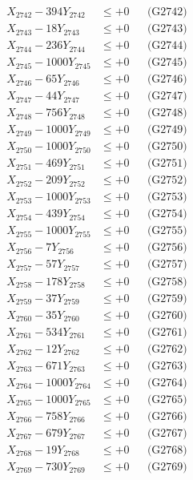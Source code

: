 \documentclass[a4paper,10pt]{article}
\begin{document}
{\begin{align}
X_{2742} - 394Y_{2742} &\leq +0 && \text{(G2742)} \\
X_{2743} - 18Y_{2743} &\leq +0 && \text{(G2743)} \\
X_{2744} - 236Y_{2744} &\leq +0 && \text{(G2744)} \\
X_{2745} - 1000Y_{2745} &\leq +0 && \text{(G2745)} \\
X_{2746} - 65Y_{2746} &\leq +0 && \text{(G2746)} \\
X_{2747} - 44Y_{2747} &\leq +0 && \text{(G2747)} \\
X_{2748} - 756Y_{2748} &\leq +0 && \text{(G2748)} \\
X_{2749} - 1000Y_{2749} &\leq +0 && \text{(G2749)} \\
X_{2750} - 1000Y_{2750} &\leq +0 && \text{(G2750)} \\
\allowbreak
X_{2751} - 469Y_{2751} &\leq +0 && \text{(G2751)} \\
X_{2752} - 209Y_{2752} &\leq +0 && \text{(G2752)} \\
X_{2753} - 1000Y_{2753} &\leq +0 && \text{(G2753)} \\
X_{2754} - 439Y_{2754} &\leq +0 && \text{(G2754)} \\
X_{2755} - 1000Y_{2755} &\leq +0 && \text{(G2755)} \\
X_{2756} - 7Y_{2756} &\leq +0 && \text{(G2756)} \\
X_{2757} - 57Y_{2757} &\leq +0 && \text{(G2757)} \\
X_{2758} - 178Y_{2758} &\leq +0 && \text{(G2758)} \\
X_{2759} - 37Y_{2759} &\leq +0 && \text{(G2759)} \\
X_{2760} - 35Y_{2760} &\leq +0 && \text{(G2760)} \\
\allowbreak
X_{2761} - 534Y_{2761} &\leq +0 && \text{(G2761)} \\
X_{2762} - 12Y_{2762} &\leq +0 && \text{(G2762)} \\
X_{2763} - 671Y_{2763} &\leq +0 && \text{(G2763)} \\
X_{2764} - 1000Y_{2764} &\leq +0 && \text{(G2764)} \\
X_{2765} - 1000Y_{2765} &\leq +0 && \text{(G2765)} \\
X_{2766} - 758Y_{2766} &\leq +0 && \text{(G2766)} \\
X_{2767} - 679Y_{2767} &\leq +0 && \text{(G2767)} \\
X_{2768} - 19Y_{2768} &\leq +0 && \text{(G2768)} \\
X_{2769} - 730Y_{2769} &\leq +0 && \text{(G2769)} \\

\end{align}}
\end{document}
